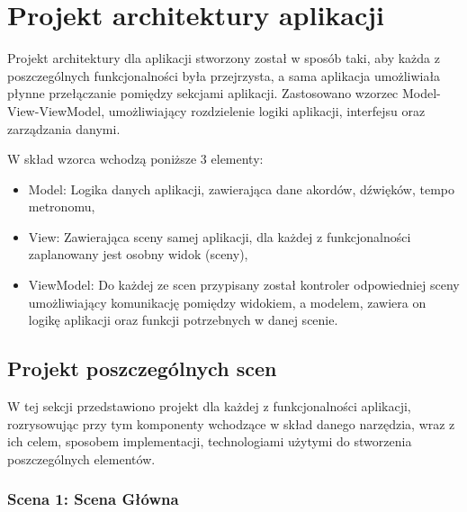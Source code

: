 
\section{Projekt architektury aplikacji}

Projekt architektury dla aplikacji stworzony został w sposób taki, aby każda z poszczególnych funkcjonalności była przejrzysta, a sama aplikacja umożliwiała płynne przełączanie pomiędzy sekcjami aplikacji. Zastosowano wzorzec Model-View-ViewModel, umożliwiający rozdzielenie logiki aplikacji, interfejsu oraz zarządzania danymi. 


W skład wzorca wchodzą poniższe 3 elementy:
\begin{itemize}
	\item Model: Logika danych aplikacji, zawierająca dane akordów, dźwięków, tempo metronomu,
	\item View: Zawierająca sceny samej aplikacji, dla każdej z funkcjonalności zaplanowany jest osobny widok (sceny),
	\item ViewModel: Do każdej ze scen przypisany został kontroler odpowiedniej sceny umożliwiający komunikację pomiędzy widokiem, a modelem, zawiera on logikę aplikacji oraz funkcji potrzebnych w danej scenie.
\end{itemize}

\subsection{Projekt poszczególnych scen}

W tej sekcji przedstawiono projekt dla każdej z funkcjonalności aplikacji, rozrysowując przy tym komponenty wchodzące w skład danego narzędzia, wraz z ich celem, sposobem implementacji, technologiami użytymi do stworzenia poszczególnych elementów. 

\subsubsection{Scena 1: Scena Główna}

